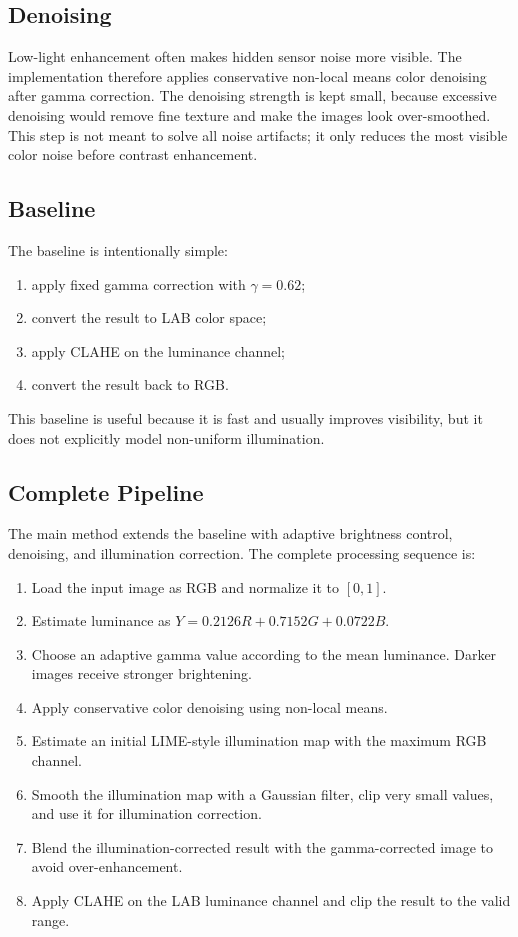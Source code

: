 \documentclass[11pt,a4paper]{article}
\begin{document}
\subsection{Denoising}

Low-light enhancement often makes hidden sensor noise more visible. The implementation therefore applies conservative non-local means color denoising after gamma correction. The denoising strength is kept small, because excessive denoising would remove fine texture and make the images look over-smoothed. This step is not meant to solve all noise artifacts; it only reduces the most visible color noise before contrast enhancement.

\subsection{Baseline}

The baseline is intentionally simple:
\begin{enumerate}
  \item apply fixed gamma correction with $\gamma=0.62$;
  \item convert the result to LAB color space;
  \item apply CLAHE on the luminance channel;
  \item convert the result back to RGB.
\end{enumerate}

This baseline is useful because it is fast and usually improves visibility, but it does not explicitly model non-uniform illumination.

\subsection{Complete Pipeline}

The main method extends the baseline with adaptive brightness control, denoising, and illumination correction. The complete processing sequence is:
\begin{enumerate}
  \item Load the input image as RGB and normalize it to $[0,1]$.
  \item Estimate luminance as $Y=0.2126R+0.7152G+0.0722B$.
  \item Choose an adaptive gamma value according to the mean luminance. Darker images receive stronger brightening.
  \item Apply conservative color denoising using non-local means.
  \item Estimate an initial LIME-style illumination map with the maximum RGB channel.
  \item Smooth the illumination map with a Gaussian filter, clip very small values, and use it for illumination correction.
  \item Blend the illumination-corrected result with the gamma-corrected image to avoid over-enhancement.
  \item Apply CLAHE on the LAB luminance channel and clip the result to the valid range.
\end{enumerate}
\end{document}
